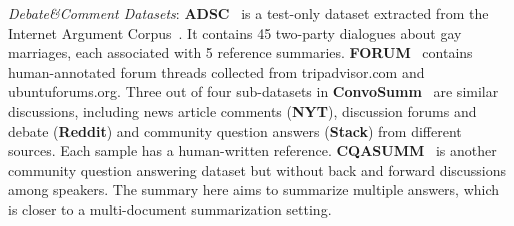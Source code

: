  \textit{Debate\&Comment Datasets}: \textbf{ADSC}~\cite{misra2015using} 
is a test-only dataset extracted from the Internet Argument 
Corpus~\cite{walker2012your}. It contains 45 two-party dialogues about gay 
marriages, each  associated with 5 reference summaries. 
\textbf{FORUM}~\cite{tarnpradab2017toward} contains human-annotated forum threads collected from tripadvisor.com and ubuntuforums.org.
Three out of four sub-datasets in \textbf{ConvoSumm}~\cite{fabbri2021convosumm} 
are similar discussions, including news article comments (\textbf{NYT}), 
discussion forums and debate (\textbf{Reddit}) and community question answers 
(\textbf{Stack}) from different sources. Each sample has a human-written reference.
\textbf{CQASUMM}~\cite{chowdhury2019cqasumm} is another community question 
answering dataset but without back and forward discussions among speakers. The summary here aims to summarize multiple answers, which is closer to a multi-document summarization setting.

